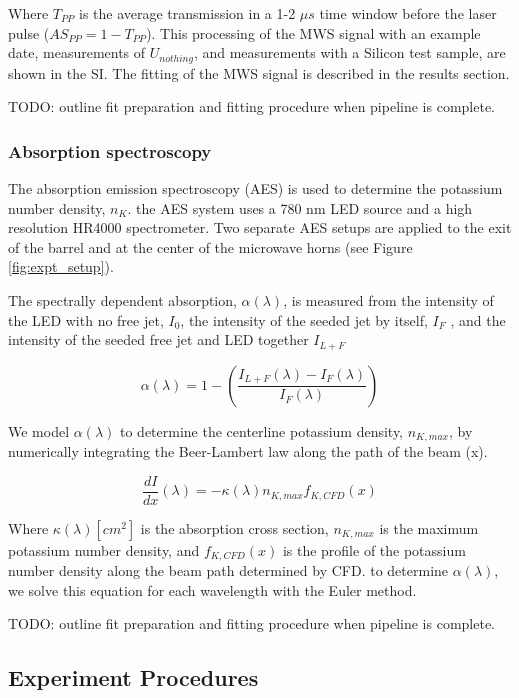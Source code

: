 Where $T_{PP}$ is the average transmission in a 1-2 $\mu s$ time window before the laser pulse ($AS_{PP} = 1 - T_{PP}$). This processing of the MWS signal with an example date, measurements of $U_{nothing}$, and measurements with a Silicon test sample, are shown in the SI. The fitting of the MWS signal is described in the results section. 

TODO: outline fit preparation and fitting procedure when pipeline is complete.

\subsubsection{Absorption spectroscopy}

The absorption emission spectroscopy (AES) is used to determine the potassium number density, $n_K$. the AES system uses a 780 nm LED source and a high resolution HR4000 spectrometer. Two separate AES setups are applied to the exit of the barrel and at the center of the microwave horns (see Figure \ref{fig:expt_setup}).

The spectrally dependent absorption, $\alpha(\lambda)$, is measured from the intensity of the LED with no free jet, $I_0$, the intensity of the seeded jet by itself, $I_F$ , and the intensity of the seeded free jet and LED together $I_{L+F}$


\begin{equation}
    \alpha(\lambda) = 1 - \left(\frac{I_{L+F}(\lambda) - I_{F}(\lambda)}{I_F(\lambda)}\right)
\end{equation}


We model $\alpha(\lambda)$ to determine the centerline potassium density, $n_{K, max}$, by numerically integrating the Beer-Lambert law along the path of the beam (x).

\begin{equation}
    \frac{dI}{dx}(\lambda) = -\kappa(\lambda) n_{K,max} f_{K, CFD}(x)
\end{equation}

Where $\kappa(\lambda) [cm^2]$ is the absorption cross section, $n_{K,max}$ is the maximum potassium number density, and $f_{K, CFD}(x)$ is the profile of the potassium number density along the beam path determined by CFD. to determine $\alpha(\lambda)$, we solve this equation for each wavelength with the Euler method.  

TODO: outline fit preparation and fitting procedure when pipeline is complete.

\subsection{Experiment Procedures}

